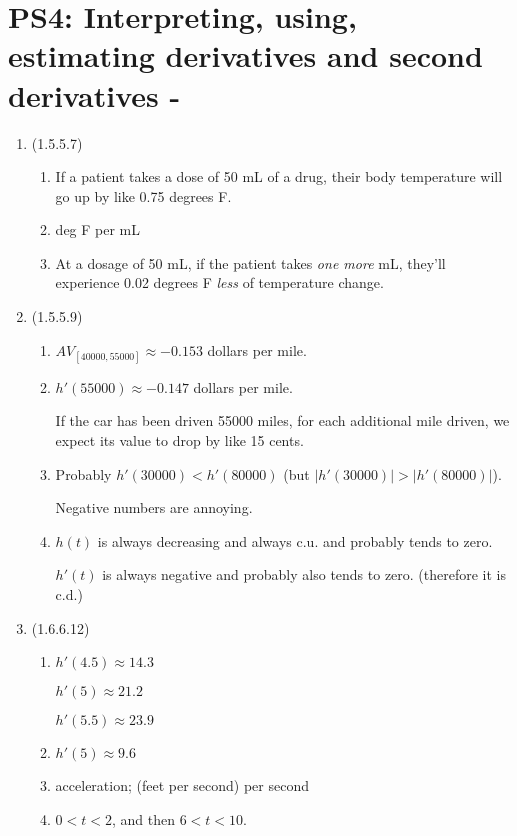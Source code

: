 


%


\allowdisplaybreaks
\section{PS4: Interpreting, using, estimating derivatives and second derivatives  -  }


\everymath{\displaystyle}
\begin{enumerate}[leftmargin=0pt]

\item (1.5.5.7)
\begin{enumerate}
    \item If a patient takes a dose of 50 mL of a drug, their body temperature will go up by like 0.75 degrees F.
    \item deg F per mL
    \item At a dosage of 50 mL, if the patient takes \textit{one more} mL, they'll experience 0.02 degrees F \textit{less} of temperature change.
\end{enumerate}

\item (1.5.5.9)
\begin{enumerate}
    \item $AV_{[40000, 55000]} \approx -0.153$ dollars per mile.
    \item $h'(55000) \approx -0.147$ dollars per mile. 

    If the car has been driven 55000 miles, for each additional mile driven, we expect its value to drop by like 15 cents.

    \item Probably $h'(30000) < h'(80000)$ (but $|h'(30000)| > |h'(80000)|$).
    
    Negative numbers are annoying.

    \item $h(t)$ is always decreasing and always c.u. and probably tends to zero.

    $h'(t)$ is always negative and probably also tends to zero. (therefore it is c.d.)
\end{enumerate}

\item (1.6.6.12)
\begin{enumerate}
    \item $h'(4.5) \approx 14.3$
    
    $h'(5) \approx 21.2$

    $h'(5.5) \approx \mathbf{23.9}$
    \item $h'(5) \approx 9.6$
    \item acceleration; (feet per second) per second
    \item $0 < t < 2$, and then $6 < t < 10$.
\end{enumerate}

\end{enumerate}


